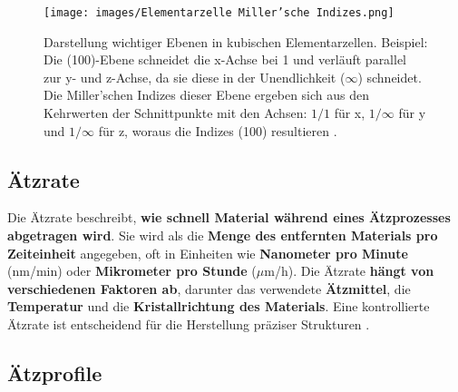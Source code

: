 \documentclass{article} %
\begin{document}
\begin{figure}[htb!]
    \centering
    \texttt{[image: images/Elementarzelle Miller'sche Indizes.png]} %
    \captionsetup{labelfont=bf, width=.95\textwidth} %
    \caption{Darstellung wichtiger Ebenen in kubischen Elementarzellen. Beispiel: Die (100)-Ebene schneidet die x-Achse bei 1 und verläuft parallel zur y- und z-Achse, da sie diese in der Unendlichkeit ($\infty$) schneidet. Die Miller'schen Indizes dieser Ebene ergeben sich aus den Kehrwerten der Schnittpunkte mit den Achsen: $1/1$ für x, $1/\infty$ für y und $1/\infty$ für z, woraus die Indizes (100) resultieren \cite{grundlagen_konstruktionswerkstoffe}.}
    \label{fig:Miller}
\end{figure}





\vspace{1em}

\subsection{Ätzrate}

Die Ätzrate beschreibt, \textbf{wie schnell Material während eines Ätzprozesses abgetragen wird}. Sie wird als die \textbf{Menge des entfernten Materials pro Zeiteinheit} angegeben, oft in Einheiten wie \textbf{Nanometer pro Minute} (nm/min) oder \textbf{Mikrometer pro Stunde} ($\mu$m/h). Die Ätzrate \textbf{hängt von verschiedenen Faktoren ab}, darunter das verwendete \textbf{Ätzmittel}, die \textbf{Temperatur} und die \textbf{Kristallrichtung des Materials}. Eine kontrollierte Ätzrate ist entscheidend für die Herstellung präziser Strukturen \cite{madou2002, schmid2024Aetzen}. 





\vspace{1em}

\subsection{Ätzprofile}
\end{document}
